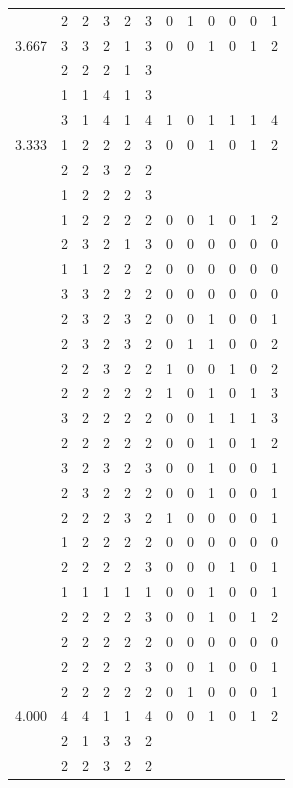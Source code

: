 \documentclass[]{book}
\theoremstyle{definition}
\theoremstyle{definition}
\theoremstyle{definition}
\theoremstyle{remark}
\begin{document}
\begin{table}
{\begin{tabular}[t]{rrrrrrrrrrrr}
 & 2 & 2 & 3 & 2 & 3 & 0 & 1 & 0 & 0 & 0 & 1\\
3.667 & 3 & 3 & 2 & 1 & 3 & 0 & 0 & 1 & 0 & 1 & 2\\
 & 2 & 2 & 2 & 1 & 3 &  &  &  &  &  & \\
 & 1 & 1 & 4 & 1 & 3 &  &  &  &  &  & \\
 & 3 & 1 & 4 & 1 & 4 & 1 & 0 & 1 & 1 & 1 & 4\\
3.333 & 1 & 2 & 2 & 2 & 3 & 0 & 0 & 1 & 0 & 1 & 2\\
 & 2 & 2 & 3 & 2 & 2 &  &  &  &  &  & \\
 & 1 & 2 & 2 & 2 & 3 &  &  &  &  &  & \\
 & 1 & 2 & 2 & 2 & 2 & 0 & 0 & 1 & 0 & 1 & 2\\
 & 2 & 3 & 2 & 1 & 3 & 0 & 0 & 0 & 0 & 0 & 0\\
 & 1 & 1 & 2 & 2 & 2 & 0 & 0 & 0 & 0 & 0 & 0\\
 & 3 & 3 & 2 & 2 & 2 & 0 & 0 & 0 & 0 & 0 & 0\\
 & 2 & 3 & 2 & 3 & 2 & 0 & 0 & 1 & 0 & 0 & 1\\
 & 2 & 3 & 2 & 3 & 2 & 0 & 1 & 1 & 0 & 0 & 2\\
 & 2 & 2 & 3 & 2 & 2 & 1 & 0 & 0 & 1 & 0 & 2\\
 & 2 & 2 & 2 & 2 & 2 & 1 & 0 & 1 & 0 & 1 & 3\\
 & 3 & 2 & 2 & 2 & 2 & 0 & 0 & 1 & 1 & 1 & 3\\
 & 2 & 2 & 2 & 2 & 2 & 0 & 0 & 1 & 0 & 1 & 2\\
 & 3 & 2 & 3 & 2 & 3 & 0 & 0 & 1 & 0 & 0 & 1\\
 & 2 & 3 & 2 & 2 & 2 & 0 & 0 & 1 & 0 & 0 & 1\\
 & 2 & 2 & 2 & 3 & 2 & 1 & 0 & 0 & 0 & 0 & 1\\
 & 1 & 2 & 2 & 2 & 2 & 0 & 0 & 0 & 0 & 0 & 0\\
 & 2 & 2 & 2 & 2 & 3 & 0 & 0 & 0 & 1 & 0 & 1\\
 & 1 & 1 & 1 & 1 & 1 & 0 & 0 & 1 & 0 & 0 & 1\\
 & 2 & 2 & 2 & 2 & 3 & 0 & 0 & 1 & 0 & 1 & 2\\
 & 2 & 2 & 2 & 2 & 2 & 0 & 0 & 0 & 0 & 0 & 0\\
 & 2 & 2 & 2 & 2 & 3 & 0 & 0 & 1 & 0 & 0 & 1\\
 & 2 & 2 & 2 & 2 & 2 & 0 & 1 & 0 & 0 & 0 & 1\\
4.000 & 4 & 4 & 1 & 1 & 4 & 0 & 0 & 1 & 0 & 1 & 2\\
 & 2 & 1 & 3 & 3 & 2 &  &  &  &  &  & \\
 & 2 & 2 & 3 & 2 & 2 &  &  &  &  &  & \\

\end{tabular}}
\end{table}
\end{document}
